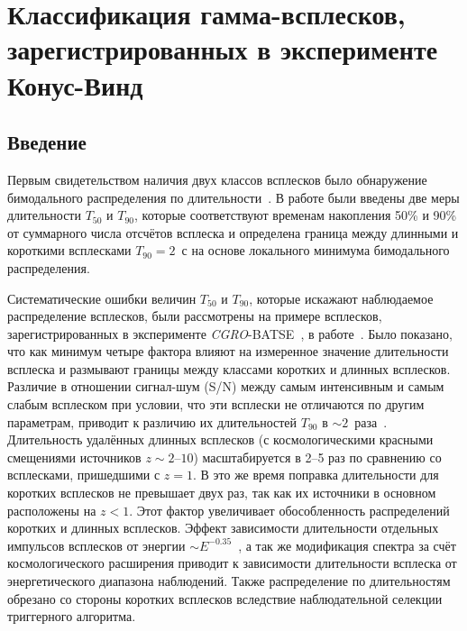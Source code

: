 \chapter{Классификация гамма-всплесков, зарегистрированных в эксперименте Конус-Винд}\label{KW_GRB_classification}

\section{Введение}
Первым свидетельством наличия двух классов всплесков было обнаружение бимодального 
распределения по длительности~\citep{Mazets_1981_part_1,Norris_1984,Kouveliotou_1993,Aptekar_1998}. 
В работе \citep{Kouveliotou_1993} были введены две меры длительности $T_{50}$ и $T_{90}$, 
которые соответствуют временам накопления 50\% и 90\% от суммарного числа отсчётов 
всплеска и определена граница между длинными и короткими всплесками $T_{90}=2$~с 
на основе локального минимума бимодального распределения. 

Систематические ошибки величин $T_{50}$ и $T_{90}$, которые искажают наблюдаемое 
распределение всплесков, были рассмотрены на примере всплесков, 
зарегистрированных в эксперименте \textit{CGRO}-BATSE~\citep{Fishman_1992NASCP3137}, 
в работе~\citep{Norris_and_Bonnel_2006}. Было показано, 
что как минимум четыре фактора влияют на измеренное значение длительности 
всплеска и размывают границы между классами коротких и длинных всплесков. 
Различие в отношении сигнал-шум (S/N) между самым интенсивным и самым слабым 
всплеском  при условии, что эти всплески не отличаются по другим параметрам, 
приводит к различию их длительностей $T_{90}$ в $\sim 2$~раза~\citep{Bonnell_1997}. 
Длительность удалённых длинных всплесков (с космологическими красными смещениями источников 
$z \sim 2 \textrm{--}10$) масштабируется в 2--5 раз по сравнению со всплесками, 
пришедшими с $z=1$. В это же время поправка длительности 
для коротких всплесков не превышает двух раз, так как их источники в основном 
расположены на $z<1$. Этот фактор увеличивает обособленность распределений 
коротких и длинных всплесков. Эффект зависимости длительности отдельных импульсов 
всплесков от энергии $\sim E^{-0.35}$~\citep{Fenimore_1995}, а так же  модификация 
спектра за счёт космологического расширения приводит к зависимости длительности 
всплеска от энергетического диапазона наблюдений. Также распределение по длительностям 
обрезано со стороны коротких всплесков вследствие наблюдательной селекции триггерного 
алгоритма. 

